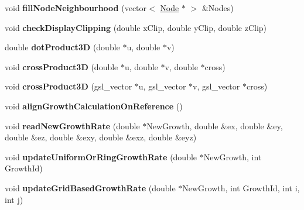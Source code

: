 \begin{DoxyCompactItemize}
\item 
\hypertarget{classShapeBase_afe299910c51313a27526c585df128047}{}void {\bfseries fill\+Node\+Neighbourhood} (vector$<$ \hyperlink{classNode}{Node} $\ast$ $>$ \&Nodes)\label{classShapeBase_afe299910c51313a27526c585df128047}

\item 
\hypertarget{classShapeBase_a3a3490f8a96e14e59b82f4de24ce48e2}{}void {\bfseries check\+Display\+Clipping} (double x\+Clip, double y\+Clip, double z\+Clip)\label{classShapeBase_a3a3490f8a96e14e59b82f4de24ce48e2}

\item 
\hypertarget{classShapeBase_a6b58642f88a23bd984d7af48cbd4f95a}{}double {\bfseries dot\+Product3\+D} (double $\ast$u, double $\ast$v)\label{classShapeBase_a6b58642f88a23bd984d7af48cbd4f95a}

\item 
\hypertarget{classShapeBase_ab5c4c774227af1d446f80c0ef58044c9}{}void {\bfseries cross\+Product3\+D} (double $\ast$u, double $\ast$v, double $\ast$cross)\label{classShapeBase_ab5c4c774227af1d446f80c0ef58044c9}

\item 
\hypertarget{classShapeBase_a334a6cec6a698ac49006d8216a93ced9}{}void {\bfseries cross\+Product3\+D} (gsl\+\_\+vector $\ast$u, gsl\+\_\+vector $\ast$v, gsl\+\_\+vector $\ast$cross)\label{classShapeBase_a334a6cec6a698ac49006d8216a93ced9}

\item 
\hypertarget{classShapeBase_a9a980e69b3ccad29e21499921d575829}{}void {\bfseries align\+Growth\+Calculation\+On\+Reference} ()\label{classShapeBase_a9a980e69b3ccad29e21499921d575829}

\item 
\hypertarget{classShapeBase_a8f1565bbfd6c6a1452d95d910b4f7d9e}{}void {\bfseries read\+New\+Growth\+Rate} (double $\ast$New\+Growth, double \&ex, double \&ey, double \&ez, double \&exy, double \&exz, double \&eyz)\label{classShapeBase_a8f1565bbfd6c6a1452d95d910b4f7d9e}

\item 
\hypertarget{classShapeBase_a62f7b57ae77a98a009ba2c5cd520fa71}{}void {\bfseries update\+Uniform\+Or\+Ring\+Growth\+Rate} (double $\ast$New\+Growth, int Growth\+Id)\label{classShapeBase_a62f7b57ae77a98a009ba2c5cd520fa71}

\item 
\hypertarget{classShapeBase_aff32f6cd08aba5c167297852b72e40b0}{}void {\bfseries update\+Grid\+Based\+Growth\+Rate} (double $\ast$New\+Growth, int Growth\+Id, int i, int j)\label{classShapeBase_aff32f6cd08aba5c167297852b72e40b0}


\end{DoxyCompactItemize}
